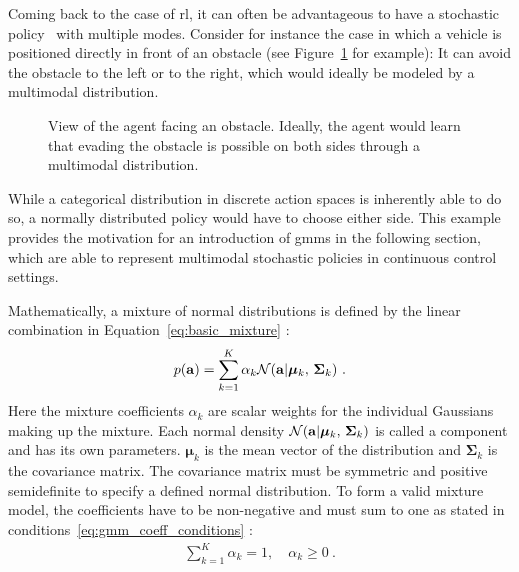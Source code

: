 Coming back to the case of \gls{rl}, it can often be advantageous to have a stochastic policy \piplain\ with multiple modes. Consider for instance the case in which a vehicle is positioned directly in front of an obstacle (see Figure~\ref{fig:agent_view_maze} for example): It can avoid the obstacle to the left or to the right, which would ideally be modeled by a multimodal distribution.
\begin{figure}[t]
	\centering
	\captionsetup{justification=centering}
	\scalebox{0.6}{
    
    }
	\caption[Agent view maze]{View of the agent facing an obstacle. Ideally, the agent would learn that evading the obstacle is possible on both sides through a multimodal distribution.}
\label{fig:agent_view_maze}
\end{figure}
While a categorical distribution in discrete action spaces is inherently able to do so, a normally distributed policy would have to choose either side. This example provides the motivation for an introduction of \glspl{gmm} in the following section, which are able to represent multimodal stochastic policies in continuous control settings.

Mathematically, a mixture of normal distributions is defined by the linear combination in Equation~\ref{eq:basic_mixture} \cite{bishopPatternRecognitionMachine2006}:
\begin{gather}\label{eq:basic_mixture}
    p(\mathbf a) = \sum_{k=1}^K \alpha_k \mathcal{N}(\mathbf a | \bm \mu_k, \, \bm \Sigma_k)~.
\end{gather}
Here the mixture coefficients $\alpha_k$ are scalar weights for the individual Gaussians making up the mixture. Each normal density $\mathcal{N}(\mathbf a | \bm \mu_k, \, \bm \Sigma_k)$ is called a component and has its own parameters. $\bm \mu_k$ is the mean vector of the distribution and $\bm \Sigma_k$ is the covariance matrix. The covariance matrix must be symmetric and positive semidefinite to specify a defined normal distribution. To form a valid mixture model, the coefficients have to be non-negative and must sum to one as stated in conditions~\ref{eq:gmm_coeff_conditions} \cite{bishopPatternRecognitionMachine2006}:
\begin{gather}\label{eq:gmm_coeff_conditions}
    \sum_{k=1}^K \alpha_k = 1, \quad \alpha_k \geq 0~.
\end{gather}

